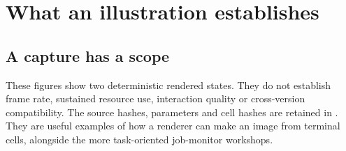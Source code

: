 \section{What an illustration establishes}
\subsection{A capture has a scope}

These figures show two deterministic rendered states. They do not establish frame rate, sustained resource use, interaction quality or cross-version compatibility. The source hashes, parameters and cell hashes are retained in . They are useful examples of how a renderer can make an image from terminal cells, alongside the more task-oriented job-monitor workshops.
